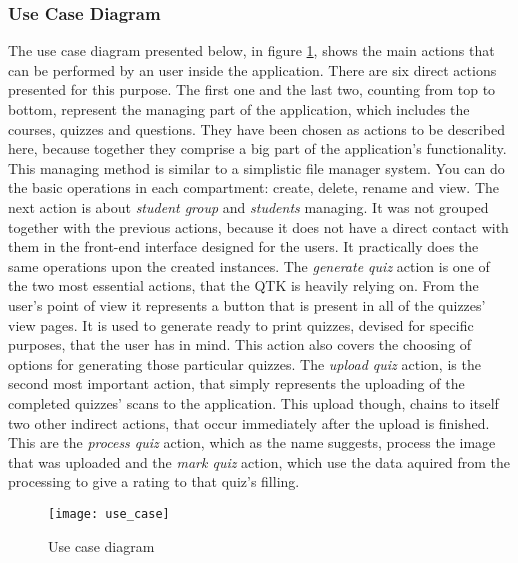 \subsubsection{Use Case Diagram}
The use case diagram presented below, in figure \ref{use_case_diagram}, shows the main actions that can be performed by an user inside the application. There are six direct actions presented for this purpose. The first one and the last two, counting from top to bottom, represent the managing part of the application, which includes the courses, quizzes and questions. They have been chosen as actions to be described here, because together they comprise a big part of the application's functionality. This managing method is similar to a simplistic file manager system. You can do the basic operations in each compartment: create, delete, rename and view. The next action is about \textit{student group} and \textit{students} managing. It was not grouped together with the previous actions, because it does not have a direct contact with them in the front-end interface designed for the users. It practically does the same operations upon the created instances. The \textit{generate quiz} action is one of the two most essential actions, that the QTK is heavily relying on. From the user's point of view it represents a button that is present in all of the quizzes' view pages. It is used to generate ready to print quizzes, devised for specific purposes, that the user has in mind. This action also covers the choosing of options for generating those particular quizzes. The \textit{upload quiz} action, is the second most important action, that simply represents the uploading of the completed quizzes' scans to the application. This upload though, chains to itself two other indirect actions, that occur immediately after the upload is finished. This are the \textit{process quiz} action, which as the name suggests, process the image that was uploaded and the \textit{mark quiz} action, which use the data aquired from the processing to give a rating to that quiz's filling.

\begin{figure}[!ht]
\centering
\texttt{[image: use\_case]}
\caption{Use case diagram} \label{use_case_diagram}
\end{figure}

